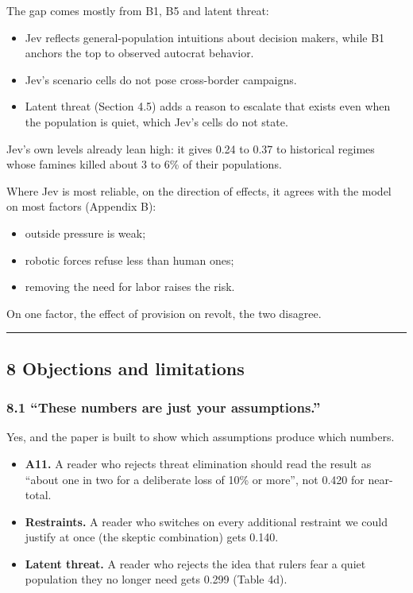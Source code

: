 \documentclass[
  10pt,
]{article}
\providecommand{\tightlist}{%
  \setlength{\itemsep}{0pt}\setlength{\parskip}{0pt}}
\begin{document}
The gap comes mostly from B1, B5 and latent threat:

\begin{itemize}
\tightlist
\item
  Jev reflects general-population intuitions about decision makers, while B1 anchors the top to
  observed autocrat behavior.
\item
  Jev's scenario cells do not pose cross-border campaigns.
\item
  Latent threat (Section 4.5) adds a reason to escalate that exists even when the population is
  quiet, which Jev's cells do not state.
\end{itemize}

Jev's own levels already lean high: it gives 0.24 to 0.37 to historical regimes whose famines killed
about 3 to 6\% of their populations.

Where Jev is most reliable, on the direction of effects, it agrees with the model on most factors
(Appendix B):

\begin{itemize}
\tightlist
\item
  outside pressure is weak;
\item
  robotic forces refuse less than human ones;
\item
  removing the need for labor raises the risk.
\end{itemize}

On one factor, the effect of provision on revolt, the two disagree.

\begin{center}\rule{0.5\linewidth}{0.5pt}\end{center}

\subsection{8 Objections and limitations}\label{objections-and-limitations}

\subsubsection{8.1 ``These numbers are just your
assumptions.''}\label{these-numbers-are-just-your-assumptions.}

Yes, and the paper is built to show which assumptions produce which numbers.

\begin{itemize}
\tightlist
\item
  \textbf{A11.} A reader who rejects threat elimination should read the result as ``about one in two
  for a deliberate loss of 10\% or more'', not 0.420 for near-total.
\item
  \textbf{Restraints.} A reader who switches on every additional restraint we could justify at once
  (the skeptic combination) gets 0.140.
\item
  \textbf{Latent threat.} A reader who rejects the idea that rulers fear a quiet population they no
  longer need gets 0.299 (Table 4d).
\end{itemize}
\end{document}
